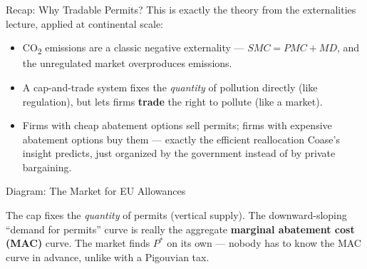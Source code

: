 \documentclass[11pt,aspectratio=169]{beamer}
\begin{document}
\begin{frame}{Recap: Why Tradable Permits?}
  This is exactly the theory from the externalities lecture, applied at continental scale:
  \begin{itemize}
    \item CO\textsubscript{2} emissions are a classic negative externality --- $SMC = PMC + MD$, and the unregulated market overproduces emissions.
    \item A cap-and-trade system fixes the \emph{quantity} of pollution directly (like regulation), but lets firms \textbf{trade} the right to pollute (like a market).
    \item Firms with cheap abatement options sell permits; firms with expensive abatement options buy them --- exactly the efficient reallocation Coase's insight predicts, just organized by the government instead of by private bargaining.
  \end{itemize}
\end{frame}

\begin{frame}{Diagram: The Market for EU Allowances}
  \begin{center}
  \end{center}
  \footnotesize The cap fixes the \emph{quantity} of permits (vertical supply). The downward-sloping ``demand for permits'' curve is really the aggregate \textbf{marginal abatement cost (MAC)} curve. The market finds $P^*$ on its own --- nobody has to know the MAC curve in advance, unlike with a Pigouvian tax.
\end{frame}
\end{document}
